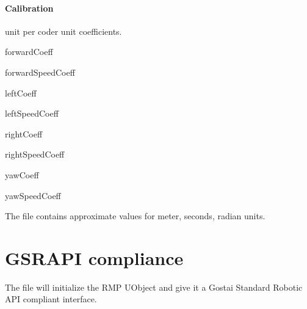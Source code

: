 \paragraph{Calibration}

\urbi unit per coder unit coefficients.

\begin{urbiscriptapi}
\item[forwardCoeff]


\item[forwardSpeedCoeff]


\item[leftCoeff]


\item[leftSpeedCoeff]


\item[rightCoeff]


\item[rightSpeedCoeff]


\item[yawCoeff]


\item[yawSpeedCoeff]
\end{urbiscriptapi}

The file  contains approximate values for meter, seconds,
radian units.


\section{GSRAPI compliance}

The file  will initialize the RMP UObject and give it a Gostai
Standard Robotic API compliant interface.


